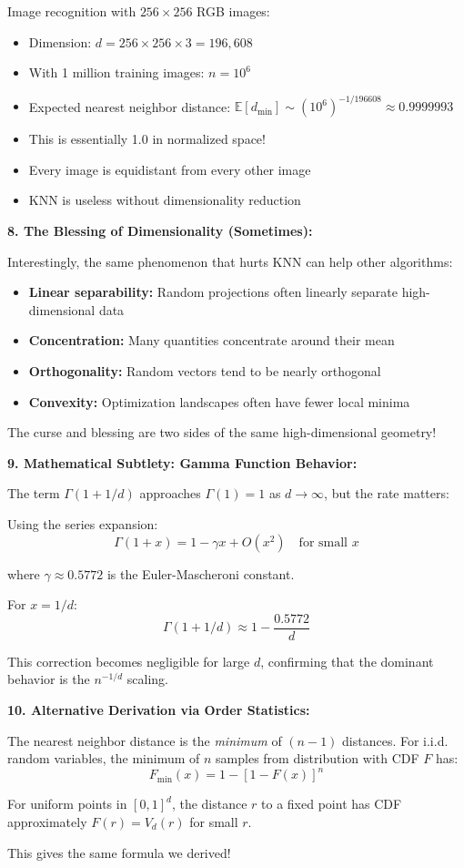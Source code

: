\documentclass[12pt]{article}
\begin{document}
\begin{explanation}
Image recognition with $256\times256$ RGB images:
\begin{itemize}
    \item Dimension: $d = 256 \times 256 \times 3 = 196,608$
    \item With 1 million training images: \(n = 10^6\)
    \item Expected nearest neighbor distance: \(\mathbb{E}[d_{\min}] \sim (10^6)^{-1/196608} \approx 0.9999993\)
    \item This is essentially 1.0 in normalized space!
    \item Every image is equidistant from every other image
    \item KNN is useless without dimensionality reduction
\end{itemize}

\textbf{8. The Blessing of Dimensionality (Sometimes):}

Interestingly, the same phenomenon that hurts KNN can help other algorithms:

\begin{itemize}
    \item \textbf{Linear separability:} Random projections often linearly separate high-dimensional data
    \item \textbf{Concentration:} Many quantities concentrate around their mean
    \item \textbf{Orthogonality:} Random vectors tend to be nearly orthogonal
    \item \textbf{Convexity:} Optimization landscapes often have fewer local minima
\end{itemize}

The curse and blessing are two sides of the same high-dimensional geometry!

\textbf{9. Mathematical Subtlety: Gamma Function Behavior:}

The term \(\Gamma(1 + 1/d)\) approaches \(\Gamma(1) = 1\) as \(d \to \infty\), but the rate matters:

Using the series expansion:
\[
\Gamma(1 + x) = 1 - \gamma x + O(x^2) \quad \text{for small } x
\]

where \(\gamma \approx 0.5772\) is the Euler-Mascheroni constant.

For \(x = 1/d\):
\[
\Gamma(1 + 1/d) \approx 1 - \frac{0.5772}{d}
\]

This correction becomes negligible for large \(d\), confirming that the dominant behavior is the \(n^{-1/d}\) scaling.

\textbf{10. Alternative Derivation via Order Statistics:}

The nearest neighbor distance is the \textit{minimum} of \((n-1)\) distances. For i.i.d. random variables, the minimum of \(n\) samples from distribution with CDF \(F\) has:
\[
F_{\min}(x) = 1 - [1 - F(x)]^n
\]

For uniform points in \([0,1]^d\), the distance \(r\) to a fixed point has CDF approximately \(F(r) = V_d(r)\) for small \(r\).

This gives the same formula we derived!
\end{explanation}
\end{document}
